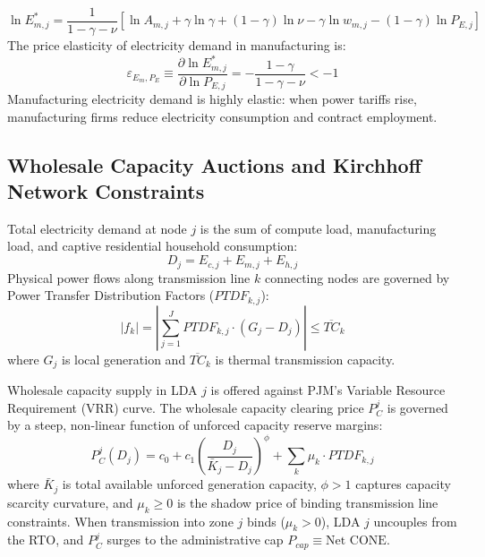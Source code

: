 \documentclass[11pt,a4paper]{article}
\begin{document}
\begin{equation}\label{eq:mfg_energy_demand}
    \ln E_{m,j}^* = \frac{1}{1-\gamma-\nu} \left[ \ln A_{m,j} + \gamma \ln \gamma + (1-\gamma)\ln \nu - \gamma \ln w_{m,j} - (1-\gamma) \ln P_{E,j} \right]
\end{equation}
The price elasticity of electricity demand in manufacturing is:
\begin{equation}
    \varepsilon_{E_m, P_E} \equiv \frac{\partial \ln E_{m,j}^*}{\partial \ln P_{E,j}} = -\frac{1-\gamma}{1-\gamma-\nu} < -1
\end{equation}
Manufacturing electricity demand is highly elastic: when power tariffs rise, manufacturing firms reduce electricity consumption and contract employment.

\subsection{Wholesale Capacity Auctions and Kirchhoff Network Constraints}

Total electricity demand at node $j$ is the sum of compute load, manufacturing load, and captive residential household consumption:
\begin{equation}
    D_j = E_{c,j} + E_{m,j} + E_{h,j}
\end{equation}
Physical power flows along transmission line $k$ connecting nodes are governed by Power Transfer Distribution Factors ($PTDF_{k,j}$):
\begin{equation}
    |f_k| = \left| \sum_{j=1}^J PTDF_{k,j} \cdot (G_j - D_j) \right| \le \overline{TC}_k
\end{equation}
where $G_j$ is local generation and $\overline{TC}_k$ is thermal transmission capacity.

Wholesale capacity supply in LDA $j$ is offered against PJM's Variable Resource Requirement (VRR) curve. The wholesale capacity clearing price $P_C^j$ is governed by a steep, non-linear function of unforced capacity reserve margins:
\begin{equation}
    P_C^j(D_j) = c_0 + c_1 \left( \frac{D_j}{\bar{K}_j - D_j} \right)^\phi + \sum_{k} \mu_k \cdot PTDF_{k,j}
\end{equation}
where $\bar{K}_j$ is total available unforced generation capacity, $\phi > 1$ captures capacity scarcity curvature, and $\mu_k \ge 0$ is the shadow price of binding transmission line constraints. When transmission into zone $j$ binds ($\mu_k > 0$), LDA $j$ uncouples from the RTO, and $P_C^j$ surges to the administrative cap $P_{cap} \equiv \text{Net CONE}$.
\end{document}
